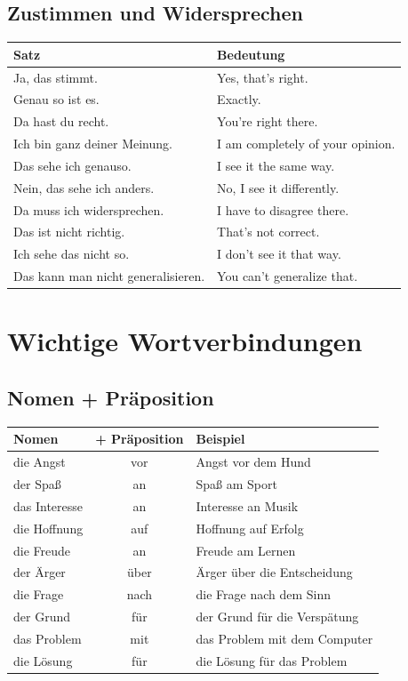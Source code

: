 \subsection{Zustimmen und Widersprechen}
\begin{center}
\begin{tabular}{|l|p{8cm}|}
\hline
\textbf{Satz} & \textbf{Bedeutung} \\ \hline
Ja, das stimmt. & Yes, that's right. \\ \hline
Genau so ist es. & Exactly. \\ \hline
Da hast du recht. & You're right there. \\ \hline
Ich bin ganz deiner Meinung. & I am completely of your opinion. \\ \hline
Das sehe ich genauso. & I see it the same way. \\ \hline
Nein, das sehe ich anders. & No, I see it differently. \\ \hline
Da muss ich widersprechen. & I have to disagree there. \\ \hline
Das ist nicht richtig. & That's not correct. \\ \hline
Ich sehe das nicht so. & I don't see it that way. \\ \hline
Das kann man nicht generalisieren. & You can't generalize that. \\ \hline
\end{tabular}
\end{center}

\section{Wichtige Wortverbindungen}
\label{sec:Wortverbindungen}

\subsection{Nomen + Präposition}
\begin{center}
\begin{tabular}{|l|c|l|}
\hline
\textbf{Nomen} & \textbf{+ Präposition} & \textbf{Beispiel} \\ \hline
die Angst & vor & Angst vor dem Hund \\ \hline
der Spaß & an & Spaß am Sport \\ \hline
das Interesse & an & Interesse an Musik \\ \hline
die Hoffnung & auf & Hoffnung auf Erfolg \\ \hline
die Freude & an & Freude am Lernen \\ \hline
der Ärger & über & Ärger über die Entscheidung \\ \hline
die Frage & nach & die Frage nach dem Sinn \\ \hline
der Grund & für & der Grund für die Verspätung \\ \hline
das Problem & mit & das Problem mit dem Computer \\ \hline
die Lösung & für & die Lösung für das Problem \\ \hline
\end{tabular}
\end{center}

